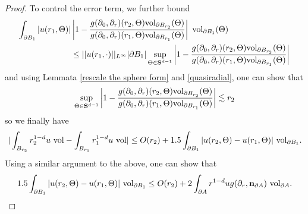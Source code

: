 \begin{proof}
To control the error term, we further bound
\begin{align*}
\int_{\partial B_1} |u(r_1, \Theta)|
&\left|1 - \frac{g(\partial_0, \partial_r)(r_2, \Theta) \mathrm{vol}_{\partial B_{r_2}}(\Theta)}{g(\partial_0, \partial_r)(r_1, \Theta) \mathrm{vol}_{\partial B_{r_1}}(\Theta)}\right| ~\mathrm{vol}_{\partial B_1}(\Theta) \\
&\leq ||u(r_1, \cdot)||_{L^\infty} |\partial B_1| \sup_{\Theta \in \mathbf S^{d - 1}} \left|1 - \frac{g(\partial_0, \partial_r)(r_2, \Theta) \mathrm{vol}_{\partial B_{r_2}}(\Theta)}{g(\partial_0, \partial_r)(r_1, \Theta) \mathrm{vol}_{\partial B_{r_1}}(\Theta)}\right|
\end{align*}
and using Lemmata \ref{rescale the sphere form} and \ref{quasiradial}, one can show that
$$\sup_{\Theta \in \mathbf S^{d - 1}} \left|1 - \frac{g(\partial_0, \partial_r)(r_2, \Theta) \mathrm{vol}_{\partial B_{r_2}}(\Theta)}{g(\partial_0, \partial_r)(r_1, \Theta) \mathrm{vol}_{\partial B_{r_1}}(\Theta)}\right| \lesssim r_2$$
so we finally have
$$
|\int_{B_{r_2}} r_2^{1 - d}u ~\mathrm{vol} - \int_{B_{r_1}} r_1^{1 - d}u ~\mathrm{vol}|
\leq O(r_2) + 1.5 \int_{\partial B_1} |u(r_2, \Theta) - u(r_1, \Theta)| ~\mathrm{vol}_{\partial B_1}.$$
Using a similar argument to the above, one can show that
$$1.5 \int_{\partial B_1} |u(r_2, \Theta) - u(r_1, \Theta)| ~\mathrm{vol}_{\partial B_1} \leq O(r_2) + 2 \int_{\partial A} r^{1 - d} ug(\partial_r, \mathbf n_{\partial A}) ~\mathrm{vol}_{\partial A}.$$


\end{proof}
